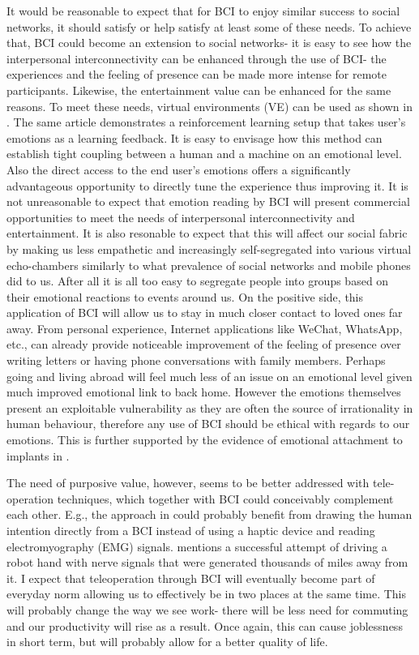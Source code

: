 \documentclass[fleqn,11pt]{olplainarticle}
\begin{document}
It would be reasonable to expect that for BCI to enjoy similar success to social networks, it should satisfy or help satisfy at least some of these needs. To achieve that, BCI could become an extension to social networks- it is easy to see how the interpersonal interconnectivity can be enhanced through the use of BCI- the experiences and the feeling of presence can be made more intense for remote participants. Likewise, the entertainment value can be enhanced for the same reasons. To meet these needs, virtual environments (VE) can be used as shown in \cite{shih2017deep}. The same article demonstrates a reinforcement learning setup that takes user's emotions as a learning feedback. It is easy to envisage how this method can establish tight coupling between a human and a machine on an emotional level. Also the direct access to the end user's emotions offers a significantly advantageous opportunity to directly tune the experience thus improving it. It is not unreasonable to expect that emotion reading by BCI will present commercial opportunities to meet the needs of interpersonal interconnectivity and entertainment. It is also resonable to expect that this will affect our social fabric by making us less empathetic and increasingly self-segregated into various virtual echo-chambers similarly to what prevalence of social networks and mobile phones did to us. After all it is all too easy to segregate people into groups based on their emotional reactions to events around us. On the positive side, this application of BCI will allow us to stay in much closer contact to loved ones far away. From personal experience, Internet applications like WeChat, WhatsApp, etc., can already provide noticeable improvement of the feeling of presence over writing letters or having phone conversations with family members. Perhaps going and living abroad will feel much less of an issue on an emotional level given much improved emotional link to back home. However the emotions themselves present an exploitable vulnerability as they are often the source of irrationality in human behaviour, therefore any use of BCI should be ethical with regards to our emotions. This is further supported by the evidence of emotional attachment to implants in \cite{warwick2003cyborg}.

The need of purposive value, however, seems to be better addressed with tele-operation techniques, which together with BCI could conceivably complement each other. E.g., the approach in \cite{luo2019teleoperation} could probably benefit from drawing the human intention directly from a BCI instead of using a haptic device and reading electromyography (EMG) signals. \cite{warwick2003cyborg} mentions a successful attempt of driving a robot hand with nerve signals that were generated thousands of miles away from it. I expect that teleoperation through BCI will eventually become part of everyday norm allowing us to effectively be in two places at the same time. This will probably change the way we see work- there will be less need for commuting and our productivity will rise as a result. Once again, this can cause joblessness in short term, but will probably allow for a better quality of life.
\end{document}

